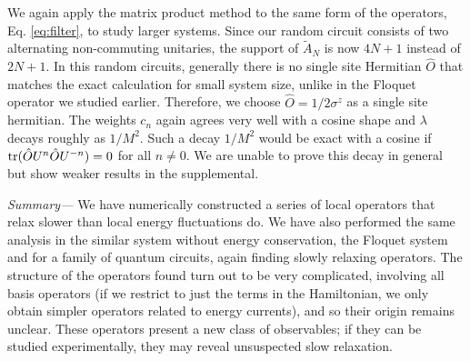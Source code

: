 \documentclass[twocolumn,superscriptaddress, prb]{revtex4-1}
\begin{document}
We again apply the matrix product method to the same form of the operators, Eq. \eqref{eq:filter},
to study larger systems. Since our random circuit consists of two alternating non-commuting unitaries,
the support of $\tilde{A}_N$ is now $4N+1$ instead of $2N+1$.
In this random circuits, generally there is no single site Hermitian $\hat{O}$
that matches the exact calculation for small system size, unlike in the Floquet operator we studied earlier.
Therefore, we choose $\hat{O} = 1/2\sigma^z$ as a single site hermitian.
The weights $c_n$ again agrees very well with a cosine shape and $\lambda$ decays roughly as $1/M^2$.
Such a decay $1/M^2$ would be exact with a cosine if
${\rm tr}(\hat{O} U^n \hat{O} U^{- n})=0$ for all $n \neq 0$.
We are unable to prove this decay in general but show weaker results in the supplemental.







{\it Summary---}
We have numerically constructed a series of local operators that relax slower than local energy fluctuations do.
We have also performed the same analysis in the similar system without energy conservation,
the Floquet system and for a family of quantum circuits, again finding slowly relaxing operators.
The structure of the operators found turn out to be very complicated, involving all basis operators
(if we restrict to just the terms in the Hamiltonian, we only obtain simpler operators related to energy currents),
and so their origin remains unclear.
These operators present a new class of observables; if they can be studied experimentally, they may reveal unsuspected slow relaxation.
\end{document}
